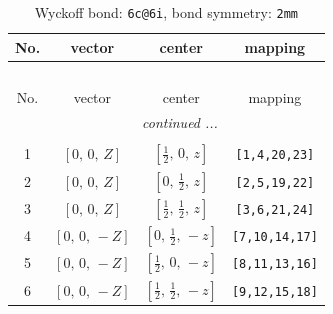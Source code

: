 \documentclass[fleqn,8pt]{jsarticle}
\begin{document}
\begin{longtable}{cccc}
\caption{Wyckoff bond: {\tt 6c@6i}, bond symmetry: {\tt 2mm}}
 \\
 \hline \hline
No. & vector & center & mapping \\ \hline \endfirsthead

\multicolumn{3}{l}{\tablename\ \thetable{}} \\
 \hline \hline
No. & vector & center & mapping \\ \hline \endhead

 \hline \hline
\multicolumn{3}{r}{\footnotesize\it continued ...} \\ \endfoot

 \hline \hline
\multicolumn{3}{r}{} \\ \endlastfoot

1 & $\left[ 0,\, 0,\, Z \right]$ & $\left[ \frac{1}{2},\, 0,\, z \right]$ & {\tt [1,4,20,23]} \\ \hline
2 & $\left[ 0,\, 0,\, Z \right]$ & $\left[ 0,\, \frac{1}{2},\, z \right]$ & {\tt [2,5,19,22]} \\ \hline
3 & $\left[ 0,\, 0,\, Z \right]$ & $\left[ \frac{1}{2},\, \frac{1}{2},\, z \right]$ & {\tt [3,6,21,24]} \\ \hline
4 & $\left[ 0,\, 0,\, - Z \right]$ & $\left[ 0,\, \frac{1}{2},\, - z \right]$ & {\tt [7,10,14,17]} \\ \hline
5 & $\left[ 0,\, 0,\, - Z \right]$ & $\left[ \frac{1}{2},\, 0,\, - z \right]$ & {\tt [8,11,13,16]} \\ \hline
6 & $\left[ 0,\, 0,\, - Z \right]$ & $\left[ \frac{1}{2},\, \frac{1}{2},\, - z \right]$ & {\tt [9,12,15,18]} \\
\end{longtable}
\renewcommand{\arraystretch}{1.2}
\end{document}
